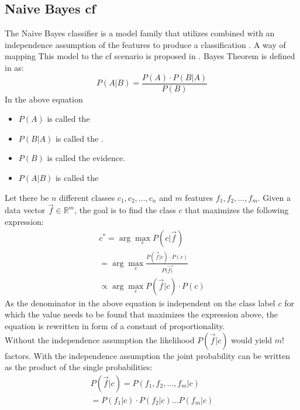 \subsection{Naive Bayes \acrshort{cf}}
The Naive Bayes classifier is a model family that utilizes  combined with an independence assumption of the features to produce a classification \cite{rish2001empirical}. A way of mapping This model to the \acrshort{cf} scenario is proposed in \cite{valdiviezo2019collaborative}. Bayes Theorem is defined in \cite{berrar2018bayes} as:\\
\begin{equation}
    P(A|B) = \frac{P(A)\cdot P(B|A)}{P(B)}
\end{equation}
In the above equation
\begin{itemize}
    \item $P(A)$ is called the 
    \item $P(B|A)$ is called the .
    \item $P(B)$ is called the evidence.
    \item $P(A|B)$ is called the 
\end{itemize}
Let there be $n$ different classes $c_1, c_2,\dots,c_n$ and $m$ features $f_1, f_2,\dots,f_m$.
Given a data vector $\Vec{f} \in \mathbb{R}^{m}$, the goal is to find the class $c$ that maximizes the following expression:\\
\begin{equation}
    \begin{align*}
        c^{*} = \arg\max_{c} P(c|\Vec{f})\\
        = \arg\max_{c} \frac{P(\Vec{f}|c)\cdot P(c)}{P(\Vec{f)}}\\
        \propto \arg\max_{c} P(\Vec{f}|c)\cdot P(c) \label{eq:1}  
    \end{align*}
\end{equation}
As the denominator in the above equation is independent on the class label $c$ for which the value needs to be found that maximizes the expression above, the equation is rewritten in form of a constant of proportionality.\\
Without the independence assumption the likelihood $P(\Vec{f}|c)$ would yield $m!$ factors.
With the independence assumption the joint probability can be written as the product of the single probabilities:
\begin{equation}
    \begin{align*}
        P(\Vec{f}|c) = P(f_1, f_2,\dots, f_m|c)\\
        = P(f_1|c)\cdot P(f_2|c) \dots P(f_m|c)
    \end{align*}
\end{equation}

